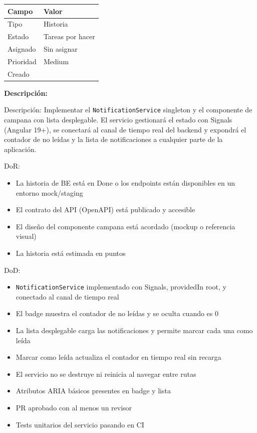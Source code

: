 \documentclass[
  spanish,
  11pt,
]{report}
\newcounter{none} %
\providecommand{\tightlist}{%
  \setlength{\itemsep}{0pt}\setlength{\parskip}{0pt}}
\begin{document}
{\def\LTcaptype{none} %
\begin{longtable}[]{@{}ll@{}}
\toprule\noalign{}
Campo & Valor \\
\midrule\noalign{}
\endhead
\bottomrule\noalign{}
\endlastfoot
Tipo & Historia \\
Estado & Tareas por hacer \\
Asignado & Sin asignar \\
Prioridad & Medium \\
Creado & \\
\end{longtable}
}

\textbf{Descripción:}

Descripción: Implementar el \texttt{NotificationService} singleton y el
componente de campana con lista desplegable. El servicio gestionará el
estado con Signals (Angular 19+), se conectará al canal de tiempo real
del backend y expondrá el contador de no leídas y la lista de
notificaciones a cualquier parte de la aplicación.

DoR:

\begin{itemize}
\tightlist
\item
  La historia de BE está en Done o los endpoints están disponibles en un
  entorno mock/staging
\item
  El contrato del API (OpenAPI) está publicado y accesible
\item
  El diseño del componente campana está acordado (mockup o referencia
  visual)
\item
  La historia está estimada en puntos
\end{itemize}

DoD:

\begin{itemize}
\tightlist
\item
  \texttt{NotificationService} implementado con Signals, providedIn
  root, y conectado al canal de tiempo real
\item
  El badge muestra el contador de no leídas y se oculta cuando es 0
\item
  La lista desplegable carga las notificaciones y permite marcar cada
  una como leída
\item
  Marcar como leída actualiza el contador en tiempo real sin recarga
\item
  El servicio no se destruye ni reinicia al navegar entre rutas
\item
  Atributos ARIA básicos presentes en badge y lista
\item
  PR aprobado con al menos un revisor
\item
  Tests unitarios del servicio pasando en CI
\end{itemize}
\end{document}
